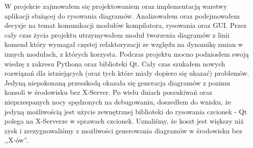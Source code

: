 W projekcie zajmowałem się projektowaniem oraz implementacją warstwy aplikacji służącej do rysowania diagramów. Analizowałem oraz podejmowałem decyzje na temat komunikacji modułów kompilatora, rysowania oraz GUI. Przez cały czas życia projektu utrzymywałem moduł tworzenia diagramów z linii komend który wymagał częstej refaktoryzacji ze względu na dynamikę zmian w innych modułach, z których korzysta.
Podczas projektu mocno podniosłem swoją wiedzę z zakresu Pythona oraz biblioteki Qt. Cały czas szukałem nowych rozwiązań dla istniejących (oraz tych które miały dopiero się ukazać) problemów. Jedyną niepokonaną przeszkodą okazała się generacja diagramów z pozimu konsoli w środowisku bez X-Server. Po wielu dniach poszukiwań oraz nieprzespanych nocy spędzonych na debugowaniu, doszedłem do wnisku, że jedyną możliwością jest użycie zewnętrznej biblioteki do rysowania czcionek - Qt polega na X-Serverze w sprawach czcionek. Uznaliśmy, że koszt jest większy niż zysk i zrezygnowaliśmy z możliwości generowania diagramów w środowisku bez ,,X-ów''.